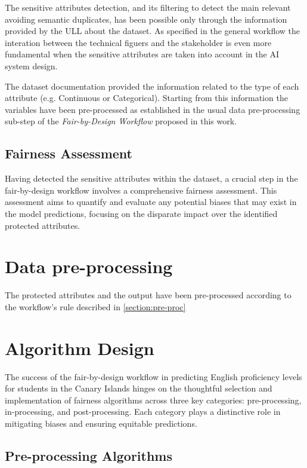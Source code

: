 \documentclass[12pt,a4paper,openright,twoside]{book}
\begin{document}
The sensitive attributes detection, and its filtering to detect the main relevant avoiding semantic duplicates, has been possible only through the information provided by the ULL about the dataset. As specified in the general workflow the interation between the technical figuers and the stakeholder is even more fundamental when the sensitive attributes are taken into account in the AI system design.

The dataset documentation provided the information related to the type of each attribute (e.g. Continuous or Categorical). Starting from this information the variables have been pre-processed as established in the usual data pre-processing sub-step of the \emph{Fair-by-Design Workflow} proposed in this work.

\subsection{Fairness Assessment}

Having detected the sensitive attributes within the dataset, a crucial step in the fair-by-design workflow involves a comprehensive fairness assessment. This assessment aims to quantify and evaluate any potential biases that may exist in the model predictions, focusing on the disparate impact over the identified protected attributes.

\section{Data pre-processing}

The protected attributes and the output have been pre-processed according to the workflow's rule described in \cref{section:pre-proc}

\section{Algorithm Design}

The success of the fair-by-design workflow in predicting English proficiency levels for students in the Canary Islands hinges on the thoughtful selection and implementation of fairness algorithms across three key categories: pre-processing, in-processing, and post-processing. Each category plays a distinctive role in mitigating biases and ensuring equitable predictions.

\subsection{Pre-processing Algorithms}
\end{document}
